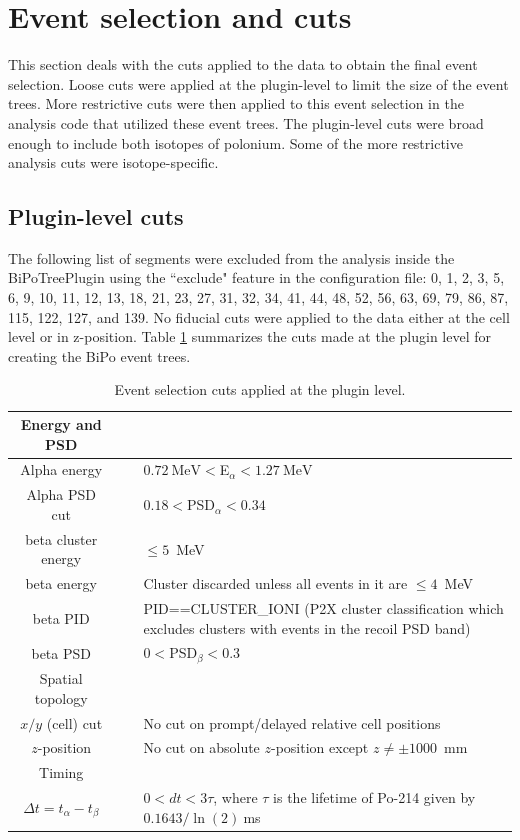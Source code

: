 \section{Event selection and cuts\label{sec:cuts}}
This section deals with the cuts applied to the data to obtain the final event selection. Loose cuts were applied at the plugin-level to limit the size of the event trees. More restrictive cuts were then applied to this event selection in the analysis code that utilized these event trees. The plugin-level cuts were broad enough to include both isotopes of polonium. Some of the more restrictive analysis cuts were isotope-specific.
\subsection{Plugin-level cuts}
The following list of segments were excluded from the analysis inside the BiPoTreePlugin using the ``exclude" feature in the configuration file: 0, 1, 2, 3, 5, 6, 9, 10, 11, 12, 13, 18, 21, 23, 27, 31, 32, 34, 41, 44, 48, 52, 56, 63, 69, 79, 86, 87, 115, 122, 127, and 139. No fiducial cuts were applied to the data either at the cell level or in z-position.
Table \ref{tab:plugincuts} summarizes the cuts made at the plugin level for creating the BiPo event trees.
\begin{table}
\begin{center}
\caption{\label{tab:plugincuts}Event selection cuts applied at the plugin level.}
\begin{tabular}[ht]{c c p{10.5cm}}\hline
Energy and PSD&~&~\\\hline\hline
Alpha energy &\vline& $0.72~\textrm{MeV}<$E$_{\alpha}<1.27~\textrm{MeV}$\\
Alpha PSD cut& \vline&$0.18<$PSD$_{\alpha}<0.34$\\
beta cluster energy &\vline& $\leq 5$~MeV\\
beta energy & \vline&Cluster discarded unless all events in it are $\leq 4$~MeV\\
beta PID & \vline&PID==CLUSTER\_IONI (P2X cluster classification which excludes clusters with events in the recoil PSD band)\\
beta PSD & \vline&$0<$PSD$_{\beta}<0.3$\\\hline
Spatial topology&~&~\\\hline\hline
$x/y$ (cell) cut &\vline& No cut on prompt/delayed relative cell positions\\
$z$-position&\vline& No cut on absolute $z$-position except $z\neq \pm1000$~mm\\
Timing&~&~\\\hline\hline
$\Delta t=t_{\alpha}-t_{\beta}$&\vline &$0< dt < 3\tau$, where $\tau$ is the lifetime of Po-214 given by $0.1643/\ln{(2)}~$ms\\\hline

\end{tabular}
\end{center}
\end{table}
